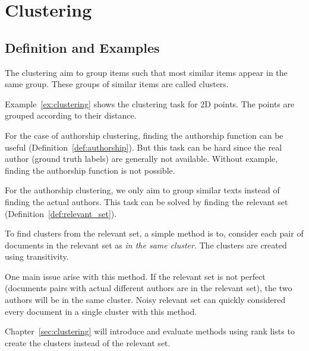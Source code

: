 \section{Clustering~\label{sec:def_clustering}}

\subsection{Definition and Examples}

The clustering aim to group items such that most similar items appear in the same group.
These groups of similar items are called clusters.

Example~\ref{ex:clustering} shows the clustering task for 2D points.
The points are grouped according to their distance.

For the case of authorship clustering, finding the authorship function can be useful (Definition~\ref{def:authorship}).
But this task can be hard since the real author (ground truth labels) are generally not available.
Without example, finding the authorship function is not possible.

For the authorship clustering, we only aim to group similar texts instead of finding the actual authors.
This task can be solved by finding the relevant set (Definition~\ref{def:relevant_set}).

To find clusters from the relevant set, a simple method is to, consider each pair of documents in the relevant set as \textit{in the same cluster}.
The clusters are created using transitivity.

One main issue arise with this method.
If the relevant set is not perfect (documents pairs with actual different authors are in the relevant set), the two authors will be in the same cluster.
Noisy relevant set can quickly considered every document in a single cluster with this method.

Chapter~\ref{sec:clustering} will introduce and evaluate methods using rank lists to create the clusters instead of the relevant set.

